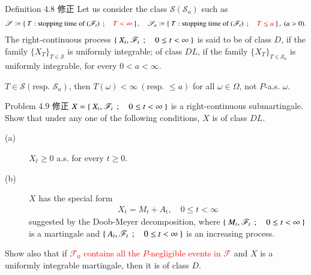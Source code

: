 	\begin{itembox}[l]{Definition 4.8 修正}
		Let us consider the class $\mathscr{S}(\mathscr{S}_a)$ such as
		\begin{align}
			\mathscr{S} \coloneqq \left\{\ T:\mbox{stopping time of $(\mathscr{F}_t)$}\ \, ; \quad \textcolor{red}{T < \infty}\ \right\},
			\quad \mathscr{S}_a \coloneqq \left\{\ T:\mbox{stopping time of $(\mathscr{F}_t)$}\ \, ; \quad \textcolor{red}{T \leq a}\ \right\},\ (a > 0).
		\end{align}
		The right-continuous process $\left\{\ X_t,\mathscr{F}_t\ \, ; \quad 0 \leq t < \infty\ \right\}$ is said to be 
		of class $D$, if the family $\{X_T\}_{T \in \mathscr{S}}$ is uniformly integrable;
		of class $DL$, if the family $\{X_T\}_{T \in \mathscr{S}_a}$ is uniformly integrable,
		for every $0 < a < \infty$.
	\end{itembox}
	$T \in \mathscr{S}(\mbox{resp. } \mathscr{S}_a)$, then 
	$T(\omega) < \infty\ (\mbox{resp. } \leq a)$
	for all $\omega \in \Omega$, not $P$-a.s. $\omega$.
	
	\begin{itembox}[l]{Problem 4.9 修正}
		$X = \left\{\ X_t,\mathscr{F}_t\ \, ; \quad 0 \leq t < \infty\ \right\}$ is a right-continuous submartingale.
		Show that under any one of the following conditions, $X$ is of class $DL$.
		\begin{description}
			\item[(a)] $X_t \geq 0$ a.s. for every $t \geq 0$.
			\item[(b)] $X$ has the special form
				\begin{align}
					X_t = M_t + A_t, \quad 0 \leq t < \infty
				\end{align}
				suggested by the Doob-Meyer decomposition, where $\left\{\ M_t,\mathscr{F}_t\ \, ; \quad 0 \leq t < \infty\ \right\}$
				is a martingale and $\left\{\ A_t,\mathscr{F}_t\ \, ; \quad 0 \leq t < \infty\ \right\}$ is an increasing process.
		\end{description}
		Show also that if \textcolor{red}{$\mathscr{F}_0$ contains all the $P$-negligible events in $\mathscr{F}$} and
		$X$ is a uniformly integrable martingale, then it is of class $D$.
	\end{itembox}
	
